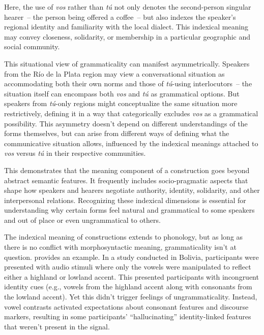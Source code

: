 \documentclass[12pt,letterpaper]{article}
\begin{document}
Here, the use of \textit{vos} rather than \textit{tú} not only denotes the second-person singular hearer~-- the person being offered a coffee~-- but also indexes the speaker’s regional identity and familiarity with the local dialect. This indexical meaning may convey closeness, solidarity, or membership in a particular geographic and social community.

This situational view of grammaticality can manifest asymmetrically. Speakers from the Río de la Plata region may view a conversational situation as accommodating both their own norms and those of \textit{tú}-using interlocutors~-- the situation itself can encompass both \textit{vos} and \textit{tú} as grammatical options. But speakers from \textit{tú}-only regions might conceptualize the same situation more restrictively, defining it in a way that categorically excludes \textit{vos} as a grammatical possibility. This asymmetry doesn't depend on different understandings of the forms themselves, but can arise from different ways of defining what the communicative situation allows, influenced by the indexical meanings attached to \textit{vos} versus \textit{tú} in their respective communities.

This demonstrates that the meaning component of a construction goes beyond abstract semantic features. It frequently includes socio-pragmatic aspects that shape how speakers and hearers negotiate authority, identity, solidarity, and other interpersonal relations. Recognizing these indexical dimensions is essential for understanding why certain forms feel natural and grammatical to some speakers and out of place or even ungrammatical to others.

The indexical meaning of constructions extends to phonology, but as long as there is no conflict with morphosyntactic meaning, grammaticality isn't at question. \textcite{Babel2025} provides an example. In a study conducted in Bolivia, participants were presented with audio stimuli where only the vowels were manipulated to reflect either a highland or lowland accent. This presented participants with incongruent identity cues (e.g., vowels from the highland accent along with consonants from the lowland accent). Yet this didn't trigger feelings of ungrammaticality. Instead, vowel contrasts activated expectations about consonant features and discourse markers, resulting in some participants' \enquote{hallucinating} identity-linked features that weren't present in the signal.
\end{document}
